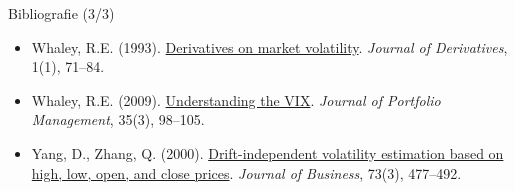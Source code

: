 \begin{frame}{Bibliografie (3/3)}
\begin{itemize}
    \item Whaley, R.E. (1993). \href{https://doi.org/10.3905/jod.1993.407868}{Derivatives on market volatility}. \textit{Journal of Derivatives}, 1(1), 71--84.
    \item Whaley, R.E. (2009). \href{https://doi.org/10.3905/JPM.2009.35.3.098}{Understanding the VIX}. \textit{Journal of Portfolio Management}, 35(3), 98--105.
    \item Yang, D., Zhang, Q. (2000). \href{https://doi.org/10.1086/209650}{Drift-independent volatility estimation based on high, low, open, and close prices}. \textit{Journal of Business}, 73(3), 477--492.
\end{itemize}
\end{frame}


